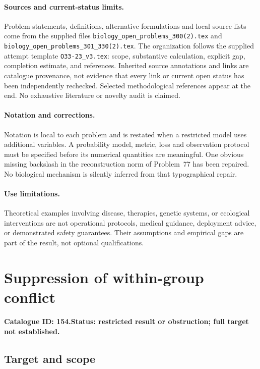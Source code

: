 \documentclass[11pt]{article}
\begin{document}
\paragraph{Sources and current-status limits.}
Problem statements, definitions, alternative formulations and local source lists
come from the supplied files
\texttt{biology\_open\_problems\_300(2).tex} and
\texttt{biology\_open\_problems\_301\_330(2).tex}.
The organization follows the supplied attempt template
\texttt{O33-23\_v3.tex}: scope, substantive calculation, explicit gap,
completion estimate, and references. Inherited source annotations and links are
catalogue provenance, not evidence that every link or current open status has
been independently rechecked. Selected methodological references appear at the
end. No exhaustive literature or novelty audit is claimed.

\paragraph{Notation and corrections.}
Notation is local to each problem and is restated when a restricted model uses
additional variables. A probability model, metric, loss and observation protocol
must be specified before its numerical quantities are meaningful. One obvious
missing backslash in the reconstruction norm of Problem~77 has been repaired.
No biological mechanism is silently inferred from that typographical repair.

\paragraph{Use limitations.}
Theoretical examples involving disease, therapies, genetic systems, or ecological
interventions are not operational protocols, medical guidance, deployment advice,
or demonstrated safety guarantees. Their assumptions and empirical gaps are part
of the result, not optional qualifications.

\setcounter{section}{153}
\section{Suppression of within-group conflict}
\label{prob:154}
\noindent\textbf{Catalogue ID: 154.}\quad \textbf{Status: restricted result or obstruction; full target not established.}
\subsection{Target and scope}
\end{document}
